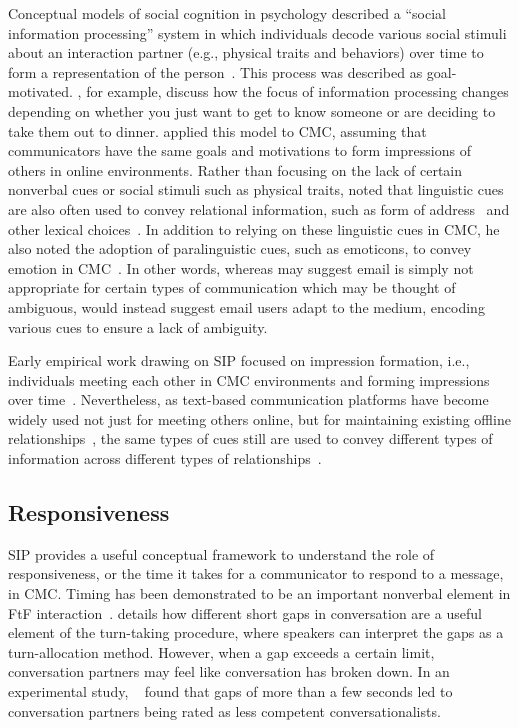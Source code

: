 \documentclass[12pt]{nuthesis}	%
\begin{document}
Conceptual models of social cognition in psychology described a ``social information processing'' system in which individuals decode various social stimuli about an interaction partner (e.g., physical traits and behaviors) over time to form a representation of the person~\citep{lord1985information}. This process was described as goal-motivated. \citet{wyer1980processing}, for example, discuss how the focus of information processing changes depending on whether you just want to get to know someone or are deciding to take them out to dinner. \citeauthor{walther1992interpersonal} applied this model to CMC, assuming that communicators have the same goals and motivations to form impressions of others in online environments. Rather than focusing on the lack of certain nonverbal cues or social stimuli such as physical traits, \citeauthor{walther1992interpersonal} noted that linguistic cues are also often used to convey relational information, such as form of address~\citep{argyle1976gaze} and other lexical choices~\citep{wiener1968language}. In addition to relying on these linguistic cues in CMC, he also noted the adoption of paralinguistic cues, such as emoticons, to convey emotion in CMC~\citep{carey1980paralanguage,sherblom1988direction}. In other words, whereas \citet{daft1986organizational} may suggest email is simply not appropriate for certain types of communication which may be thought of ambiguous, \citeauthor{walther1992interpersonal} would instead suggest email users adapt to the medium, encoding various cues to ensure a lack of ambiguity.

Early empirical work drawing on SIP focused on impression formation, i.e., individuals meeting each other in CMC environments and forming impressions over time~\citep[e.g.,][]{hancock2001impression,markey2002interpersonal,tanis2003social}. Nevertheless, as text-based communication platforms have become widely used not just for meeting others online, but for maintaining existing offline relationships~\citep{grinter2006chatting,pettegrew2015smart}, the same types of cues still are used to convey different types of information across different types of relationships~\citep{derks2008emoticons,pirzadeh2012expression}.

\subsection{Responsiveness}
SIP provides a useful conceptual framework to understand the role of responsiveness, or the time it takes for a communicator to respond to a message, in CMC. Timing has been demonstrated to be an important nonverbal element in FtF interaction~\citep{burgoon2016nonverbal}. \citet{mclaughlin1984conversation} details how different short gaps in conversation are a useful element of the turn-taking procedure, where speakers can interpret the gaps as a turn-allocation method. However, when a gap exceeds a certain limit, conversation partners may feel like conversation has broken down. In an experimental study, ~\citet{mclaughlin1982awkward} found that gaps of more than a few seconds led to conversation partners being rated as less competent conversationalists.
\end{document}

